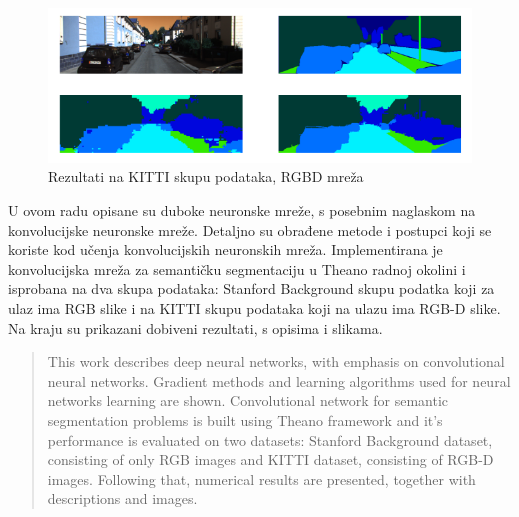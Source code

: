 \documentclass[times, utf8, diplomski, numeric]{fer}
\begin{document}
\begin{figure}[H]
  \centering
  \includegraphics[width=\textwidth]{imgs/kitti4.png}
  \caption{Rezultati na KITTI skupu podataka, RGBD mreža}
\end{figure}

\newpage

\begin{sazetak}
U ovom radu opisane su duboke neuronske mreže, s posebnim naglaskom na konvolucijske neuronske mreže. Detaljno su obrađene metode i postupci koji se koriste kod učenja konvolucijskih neuronskih mreža. Implementirana je konvolucijska mreža za semantičku segmentaciju u Theano radnoj okolini i isprobana na dva skupa podataka: Stanford Background skupu podatka koji za ulaz ima RGB slike i na KITTI skupu podataka koji na ulazu ima RGB-D slike. Na kraju su prikazani dobiveni rezultati, s opisima i slikama.

\end{sazetak}

\begin{abstract}
This work describes deep neural networks, with emphasis on convolutional neural networks. Gradient methods and learning algorithms used for neural networks learning are shown. Convolutional network for semantic segmentation problems is built using Theano framework and it's performance is evaluated on two datasets: Stanford Background dataset, consisting of only RGB images and KITTI dataset, consisting of RGB-D images. Following that, numerical results are presented, together with descriptions and images.

\end{abstract}
\end{document}
